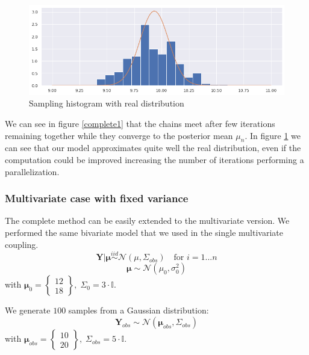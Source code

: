 \documentclass {article}
\begin{document}
\begin{figure}[h!]
	\centering
	\includegraphics[width=\textwidth]{abc_coupling/histabccoupling}
	\caption{Sampling histogram with real distribution}   %
	\label{complete2}
\end{figure}

We can see in figure \ref{complete1} that the chains meet after few iterations remaining together while they converge to the posterior mean $\mu_{n}$. In figure \ref{complete2} we can see that our model approximates quite well the real distribution, even if the computation could be improved increasing the number of iterations performing a parallelization. %



\subsubsection{Multivariate case with fixed variance}

The complete method can be easily extended to the multivariate version. We performed the same bivariate model that we used in the single multivariate coupling.
$$ \boldsymbol{Y} | \boldsymbol{\mu} \overset{iid}{\sim} \mathcal{N}(\mu, \Sigma_{obs} ) \quad \text{for } i = 1 ... n $$
$$ \boldsymbol{\mu}  \sim \mathcal{N}(\mu_0, \sigma_0^2)$$
with $\boldsymbol{\mu}_0 =
\begin{Bmatrix}    %
	12 \\
	18
\end{Bmatrix} 
, \; \Sigma_0 = 3 \cdot \mathbb{I}$.

We generate $100$ samples from a Gaussian distribution:
$$
\boldsymbol{Y}_{obs} \sim \mathcal{N}(\boldsymbol{\mu}_{obs}, \Sigma_{obs})
$$
with
$  \boldsymbol{\mu}_{obs} =
\begin{Bmatrix}  
	10 \\
	20
\end{Bmatrix}  
, \;  \Sigma_{obs}  = 5 \cdot \mathbb{I}
$.\\
\end{document}
